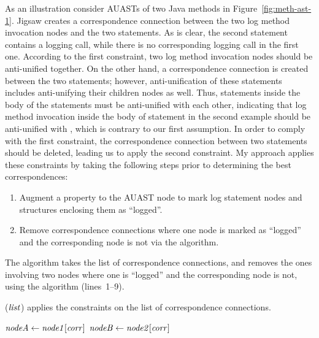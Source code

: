 As an illustration consider AUASTs of two Java methods in Figure~\ref{fig:meth-ast-1}. Jigsaw creates a correspondence connection between the two log method invocation nodes and the two  statements. As is clear, the second  statement contains a logging call, while there is no corresponding logging call in the first one. According to the first constraint, two log method invocation nodes should be anti-unified together. On the other hand, a correspondence connection is created between the two  statements; however, anti-unification of these statements includes anti-unifying their children nodes as well. Thus, statements inside the body of the  statements must be anti-unified with each other, indicating that log method invocation inside the body of  statement in the second example should be anti-unified with \nothing, which is contrary to our first assumption. In order to comply with the first constraint, the correspondence connection between two  statements should be deleted, leading us to apply the second constraint. My approach applies these constraints by taking the following steps prior to determining the best correspondences:
\begin{enumerate} [leftmargin=.4in]
\item	Augment a property to the AUAST node to mark log statement nodes and structures enclosing them as ``logged''.
\item	Remove correspondence connections where one node is marked as ``logged'' and the corresponding node is not via the  algorithm.
\end{enumerate}

The  algorithm takes the list of correspondence connections, and removes the ones involving two nodes where one is ``logged'' and the corresponding node is not, using the  algorithm (lines~1--9).

\begin{algorithm}
  \caption{($\mathit{list}$) applies the constraints on the list of correspondence connections.}
  \label{computeMatches}
  \begin{algorithmic}[1]
  \ApplyConstraints
      \State $\mathit{nodeA} \gets \mathit{node1}[\mathit{corr}]$
	  \State $\mathit{nodeB} \gets \mathit{node2}[\mathit{corr}]$
	  \EndIf 		
 \EndFor 	
	
  \end{algorithmic}
\end{algorithm}



